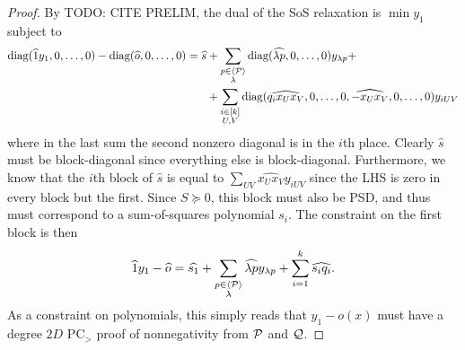 \begin{proof}
By TODO: CITE PRELIM, the dual of the SoS relaxation is $\min y_1$ subject to
\begin{align*}
\text{diag}(\widehat{1}y_1,0,\dots,0) - \text{diag}(\widehat{o},0,\dots,0) = \widehat{s} &+ \sum_{\substack{p \in \langle \mathcal P \rangle \\ \lambda}} \text{diag}(\widehat{\lambda p},0,\dots,0) y_{\lambda p} +\\
&+ \sum_{\substack{i \in [k] \\ U,V}} \text{diag}(\widehat{q_ix_Ux_V},0,\dots,0,\widehat{-x_Ux_V},0,\dots,0)y_{iUV}
\end{align*}
where in the last sum the second nonzero diagonal is in the $i$th place. Clearly $\widehat{s}$ must be block-diagonal since everything else is block-diagonal. Furthermore, we know that the $i$th block of $\widehat{s}$ is equal to $\sum_{UV} \widehat{x_Ux_V}y_{iUV}$ since the LHS is zero in every block but the first. Since $S \succeq 0$, this block must also be PSD, and thus must correspond to a sum-of-squares polynomial $s_i$. The constraint on the first block is then 
\[\widehat{1}y_1 - \widehat{o} = \widehat{s_1} + \sum_{\substack{p \in \langle \mathcal P \rangle \\ \lambda}} \widehat{\lambda p} y_{\lambda p} + \sum_{i=1}^k \widehat{s_i q_i}.\] 
As a constraint on polynomials, this simply reads that $y_1 - o(x)$ must have a degree $2D$ PC$_>$ proof of nonnegativity from $\mathcal P$ and $\mathcal Q$. 
\end{proof}

